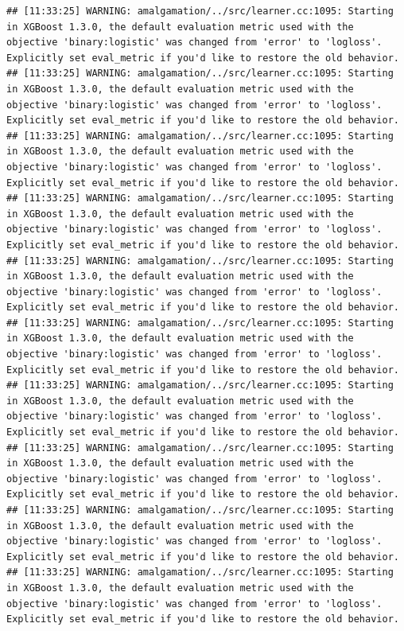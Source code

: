 \documentclass[
]{scrbook}
\begin{document}
\begin{verbatim}
## [11:33:25] WARNING: amalgamation/../src/learner.cc:1095: Starting in XGBoost 1.3.0, the default evaluation metric used with the objective 'binary:logistic' was changed from 'error' to 'logloss'. Explicitly set eval_metric if you'd like to restore the old behavior.
## [11:33:25] WARNING: amalgamation/../src/learner.cc:1095: Starting in XGBoost 1.3.0, the default evaluation metric used with the objective 'binary:logistic' was changed from 'error' to 'logloss'. Explicitly set eval_metric if you'd like to restore the old behavior.
## [11:33:25] WARNING: amalgamation/../src/learner.cc:1095: Starting in XGBoost 1.3.0, the default evaluation metric used with the objective 'binary:logistic' was changed from 'error' to 'logloss'. Explicitly set eval_metric if you'd like to restore the old behavior.
## [11:33:25] WARNING: amalgamation/../src/learner.cc:1095: Starting in XGBoost 1.3.0, the default evaluation metric used with the objective 'binary:logistic' was changed from 'error' to 'logloss'. Explicitly set eval_metric if you'd like to restore the old behavior.
## [11:33:25] WARNING: amalgamation/../src/learner.cc:1095: Starting in XGBoost 1.3.0, the default evaluation metric used with the objective 'binary:logistic' was changed from 'error' to 'logloss'. Explicitly set eval_metric if you'd like to restore the old behavior.
## [11:33:25] WARNING: amalgamation/../src/learner.cc:1095: Starting in XGBoost 1.3.0, the default evaluation metric used with the objective 'binary:logistic' was changed from 'error' to 'logloss'. Explicitly set eval_metric if you'd like to restore the old behavior.
## [11:33:25] WARNING: amalgamation/../src/learner.cc:1095: Starting in XGBoost 1.3.0, the default evaluation metric used with the objective 'binary:logistic' was changed from 'error' to 'logloss'. Explicitly set eval_metric if you'd like to restore the old behavior.
## [11:33:25] WARNING: amalgamation/../src/learner.cc:1095: Starting in XGBoost 1.3.0, the default evaluation metric used with the objective 'binary:logistic' was changed from 'error' to 'logloss'. Explicitly set eval_metric if you'd like to restore the old behavior.
## [11:33:25] WARNING: amalgamation/../src/learner.cc:1095: Starting in XGBoost 1.3.0, the default evaluation metric used with the objective 'binary:logistic' was changed from 'error' to 'logloss'. Explicitly set eval_metric if you'd like to restore the old behavior.
## [11:33:25] WARNING: amalgamation/../src/learner.cc:1095: Starting in XGBoost 1.3.0, the default evaluation metric used with the objective 'binary:logistic' was changed from 'error' to 'logloss'. Explicitly set eval_metric if you'd like to restore the old behavior.

\end{verbatim}
\end{document}

